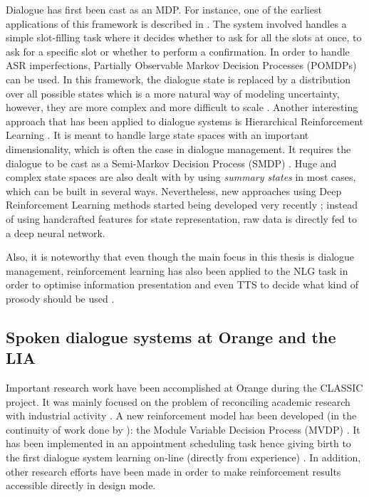 		Dialogue has first been cast as an MDP. For instance, one of the earliest applications of this framework is described in \cite{Singh1999}. The system involved handles a simple slot-filling task where it decides whether to ask for all the slots at once, to ask for a specific slot or whether to perform a confirmation. In order to handle ASR imperfections, Partially Observable Markov Decision Processes (POMDPs) \cite{Young2006,Williams2007} can be used. In this framework, the dialogue state is replaced by a distribution over all possible states which is a more natural way of modeling uncertainty, however, they are more complex and more difficult to scale \cite{Lemon2007}. Another interesting approach that has been applied to dialogue systems is Hierarchical Reinforcement Learning \cite{Cuayahuitl2007}. It is meant to handle large state spaces with an important dimensionality, which is often the case in dialogue management. It requires the dialogue to be cast as a Semi-Markov Decision Process (SMDP) \cite{Bradtke1994,Barto2003}. Huge and complex state spaces are also dealt with by using \textit{summary states} in most cases, which can be built in several ways. Nevertheless, new approaches using Deep Reinforcement Learning methods started being developed very recently \cite{Cuayahuitl2015}; instead of using handcrafted features for state representation, raw data is directly fed to a deep neural network.
		
		Also, it is noteworthy that even though the main focus in this thesis is dialogue management, reinforcement learning has also been applied to the NLG task in order to optimise information presentation \cite{Walker2000,Rieser2011b} and even TTS to decide what kind of prosody should be used \cite{Bretier2010}.
	
	\subsection{Spoken dialogue systems at Orange and the LIA}

        	        Important research work have been accomplished at Orange during the CLASSIC project. It was mainly focused on the problem of reconciling academic research with industrial activity \cite{Paek2007}. A new reinforcement model has been developed (in the continuity of work done by \cite{Singh2002,Williams2008}): the Module Variable Decision Process (MVDP) \cite{Laroche2010a}. It has been implemented in an appointment scheduling task hence giving birth to the first dialogue system learning on-line (directly from experience) \cite{Putois2010}. In addition, other research efforts have been made in order to make reinforcement results accessible directly in design mode.

